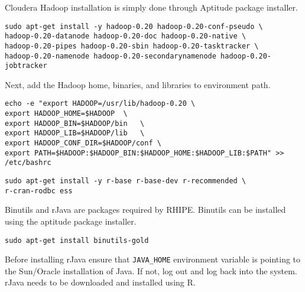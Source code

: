 \documentclass[11pt]{article}
\begin{document}

Cloudera Hadoop installation is simply done through Aptitude package
installer.

\begin{verbatim}
sudo apt-get install -y hadoop-0.20 hadoop-0.20-conf-pseudo \
hadoop-0.20-datanode hadoop-0.20-doc hadoop-0.20-native \
hadoop-0.20-pipes hadoop-0.20-sbin hadoop-0.20-tasktracker \
hadoop-0.20-namenode hadoop-0.20-secondarynamenode hadoop-0.20-jobtracker
\end{verbatim}

Next, add the Hadoop home, binaries, and libraries to environment path.

\begin{verbatim}
echo -e "export HADOOP=/usr/lib/hadoop-0.20 \
export HADOOP_HOME=$HADOOP  \
export HADOOP_BIN=$HADOOP/bin   \
export HADOOP_LIB=$HADOOP/lib   \
export HADOOP_CONF_DIR=$HADOOP/conf \
export PATH=$HADOOP:$HADOOP_BIN:$HADOOP_HOME:$HADOOP_LIB:$PATH" >> /etc/bashrc
\end{verbatim}

\hyperdef{}{r}{}
\hyperdef{}{}{\subsection{R}}

\begin{verbatim}
sudo apt-get install -y r-base r-base-dev r-recommended \
r-cran-rodbc ess
\end{verbatim}


Binutils and rJava are packages required by RHIPE. Binutils can be
installed using the aptitude package installer.

\begin{verbatim}
sudo apt-get install binutils-gold
\end{verbatim}

Before installing rJava ensure that \texttt{JAVA\_HOME} environment
variable is pointing to the Sun/Oracle installation of Java. If not, log
out and log back into the system. rJava needs to be downloaded and
installed using R.
\end{document}
